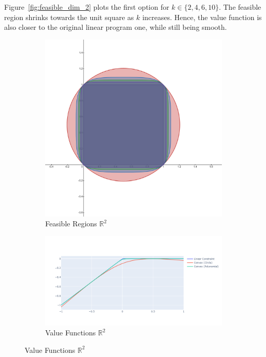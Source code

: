 \documentclass[11pt,a4paper,english]{article} %
\numberwithin{equation}{section}
\numberwithin{figure}{section}
\numberwithin{table}{section}
\theoremstyle{definition}
\theoremstyle{remark}
\begin{document}
Figure~\ref{fig:feasible_dim_2} plots the first option for $k\in\{2,4,6,10\}$.
The feasible region shrinks towards the unit square as $k$ increases.
Hence, the value function is also closer to the original linear program one, while still being smooth.

\begin{figure}
	\centering
	\caption{Feasible Regions and Value Functions in $\mathbb{R}^2$.}\label{fig:feasible_dim_2}

	\begin{subfigure}{0.9\textwidth}
		\includegraphics[width=\textwidth]{../figures/desmos_dim_2_v2.png}
		\caption{Feasible Regions $\mathbb{R}^2$}
	\end{subfigure}

	\begin{subfigure}{0.9\textwidth}
		\includegraphics[width=\textwidth]{../figures/value_function_dim_2.png}
		\caption{Value Functions $\mathbb{R}^2$}
	\end{subfigure}
\end{figure}
\end{document}
